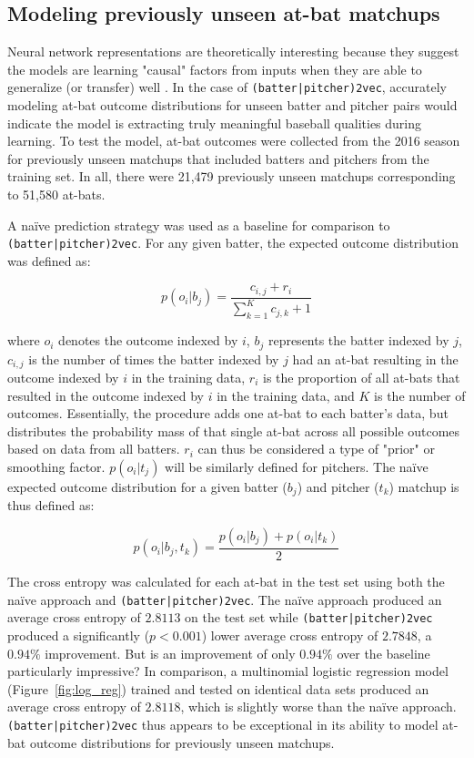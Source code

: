 \documentclass{article}
\begin{document}
\subsection{Modeling previously unseen at-bat matchups}

Neural network representations are theoretically interesting because they suggest the models are learning "causal" factors from inputs when they are able to generalize (or transfer) well \parencite{RepresentationLearning}. In the case of \texttt{(batter|pitcher)2vec}, accurately modeling at-bat outcome distributions for unseen batter and pitcher pairs would indicate the model is extracting truly meaningful baseball qualities during learning. To test the model, at-bat outcomes were collected from the 2016 season for previously unseen matchups that included batters and pitchers from the training set. In all, there were 21,479 previously unseen matchups corresponding to 51,580 at-bats.

A naïve prediction strategy was used as a baseline for comparison to \texttt{(batter|pitcher)2vec}. For any given batter, the expected outcome distribution was defined as:

\begin{equation}
\label{eqn:batter_naïve}
p(o_i|b_j)=\frac{c_{i,j} + r_i}{\sum_{k=1}^{K} c_{j,k} + 1}
\end{equation}

where $o_i$ denotes the outcome indexed by $i$, $b_j$ represents the batter indexed by $j$, $c_{i,j}$ is the number of times the batter indexed by $j$ had an at-bat resulting in the outcome indexed by $i$ in the training data, $r_i$ is the proportion of all at-bats that resulted in the outcome indexed by $i$ in the training data, and $K$ is the number of outcomes. Essentially, the procedure adds one at-bat to each batter's data, but distributes the probability mass of that single at-bat across all possible outcomes based on data from all batters. $r_i$ can thus be considered a type of "prior" or smoothing factor. $p(o_i|t_j)$ will be similarly defined for pitchers. The naïve expected outcome distribution for a given batter ($b_j$) and pitcher ($t_k$) matchup is thus defined as:

\begin{equation}
\label{eqn:naïve}
p(o_i|b_j,t_k) = \frac{p(o_i|b_j) + p(o_i|t_k)}{2}
\end{equation}

The cross entropy was calculated for each at-bat in the test set using both the naïve approach and \texttt{(batter|pitcher)2vec}. The naïve approach produced an average cross entropy of $2.8113$ on the test set while \texttt{(batter|pitcher)2vec} produced a significantly ($p < 0.001$) lower average cross entropy of $2.7848$, a $0.94\%$ improvement. But is an improvement of only $0.94\%$ over the baseline particularly impressive? In comparison, a multinomial logistic regression model (Figure~\ref{fig:log_reg}) trained and tested on identical data sets produced an average cross entropy of $2.8118$, which is slightly worse than the naïve approach. \texttt{(batter|pitcher)2vec} thus appears to be exceptional in its ability to model at-bat outcome distributions for previously unseen matchups.
\end{document}

